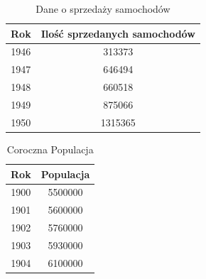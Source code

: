 \documentclass[9pt,a4paper,twoside]{rho}
\begin{document}
            \begin{table}[ht]
            \centering
            \caption{Dane o sprzedaży samochodów}
            \label{tab:yearly_sells}
            \begin{tabular}{cc}
            \toprule
            Rok & Ilość sprzedanych samochodów \\
            \midrule
            1946 & 313373 \\
            1947 & 646494 \\
            1948 & 660518 \\
            1949 & 875066 \\
            1950 & 1315365 \\
            \bottomrule
            \end{tabular}
            \end{table}
                        

            \begin{table}[ht]
            \centering
            \caption{Coroczna Populacja}
            \label{tab:average_population}
            \begin{tabular}{cc}
            \toprule
            Rok & Populacja \\
            \midrule
            1900 & 5500000 \\
            1901 & 5600000 \\
            1902 & 5760000 \\
            1903 & 5930000 \\
            1904 & 6100000 \\
            \bottomrule
            \end{tabular}
            \end{table}
\end{document}
